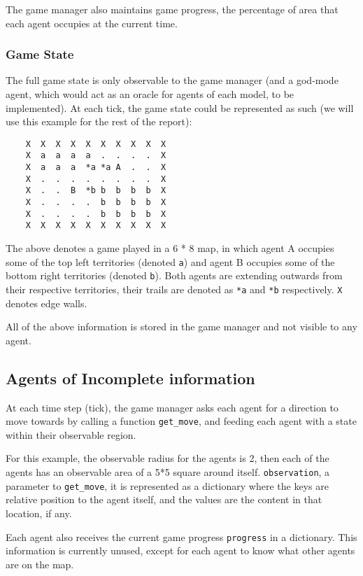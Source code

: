 \documentclass[10pt]{article}
\begin{document}
The game manager also maintains game progress, the percentage of area that each agent occupies at the current time.

\subsubsection{Game State}

The full game state is only observable to the game manager (and a god-mode agent, which would act as an oracle for agents of each model, to be implemented). At each tick, the game state could be represented as such (we will use this example for the rest of the report):

\begin{verbatim}
    X  X  X  X  X  X  X  X  X  X
    X  a  a  a  a  .  .  .  .  X
    X  a  a  a  *a *a A  .  .  X
    X  .  .  .  .  .  .  .  .  X
    X  .  .  B  *b b  b  b  b  X
    X  .  .  .  .  b  b  b  b  X
    X  .  .  .  .  b  b  b  b  X
    X  X  X  X  X  X  X  X  X  X
\end{verbatim}

The above denotes a game played in a 6 * 8 map, in which agent A occupies some of the top left territories (denoted \texttt{a}) and agent B occupies some of the bottom right territories (denoted \texttt{b}). Both agents are extending outwards from their respective territories, their trails are denoted as \texttt{*a} and \texttt{*b} respectively. \texttt{X} denotes edge walls.

All of the above information is stored in the game manager and not visible to any agent.

\subsection{Agents of Incomplete information}

At each time step (tick), the game manager asks each agent for a direction to move towards by calling a function \texttt{get\_move}, and feeding each agent with a state within their observable region. 

For this example, the observable radius for the agents is 2, then each of the agents has an observable area of a 5*5 square around itself. \texttt{observation}, a parameter to \texttt{get\_move}, it is represented as a dictionary where the keys are relative position to the agent itself, and the values are the content in that location, if any.

Each agent also receives the current game progress \texttt{progress} in a dictionary. This information is currently unused, except for each agent to know what other agents are on the map.
\end{document}
